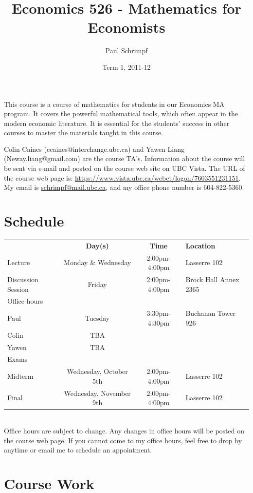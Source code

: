 \documentclass[10pt]{article}
\title{Economics 526 - Mathematics for Economists}
\date{Term 1, 2011-12}
\author{Paul Schrimpf}
\begin{document}
\maketitle

This course is a course of mathematics for students in our Economics
MA program. It covers the powerful mathematical tools, which often
appear in the modern economic literature. It is essential for the
students' success in other courses to master the materials taught in
this course.  

Colin Caines (ccaines@interchange.ubc.ca) and Yawen Liang
(Neway.liang@gmail.com) are the course TA's.  Information about the
course will be sent via e-mail and posted on the course web site on
UBC Vista. The URL of the course web page is:
\url{https://www.vista.ubc.ca/webct/logon/7603551231151}. My email is
\href{mailto:schrimp@mail.ubc.ca}{schrimpf@mail.ubc.ca}, and my office
phone number is 604-822-5360.

\section{Schedule}
\begin{tabular}{l c c l}
  \hline 
  & \textbf{Day(s)} & \textbf{Time} & \textbf{Location} \\
  Lecture & Monday \& Wednesday & 2:00pm-4:00pm &
  Lasserre 102
  \\
  Discussion Session & Friday & 2:00pm-4:00pm &
  Brock Hall Annex 2365
  \\
  Office hours \\
  \; Paul & Tuesday & 3:30pm-4:30pm & Buchanan Tower 926 \\
  \; Colin & TBA & & \\ 
  \; Yawen & TBA & & \\ \hline
  Exams \\
  \; Midterm & Wednesday, October 5th & 2:00pm-4:00pm & Lasserre 102 \\
  \; Final & Wednesday, November 9th & 2:00pm-4:00pm & Lasserre 102
  \\ \hline 
\end{tabular} \\
Office hours are subject to change. Any changes in office hours will
be posted on the course web page. If you cannot come to my office
hours, feel free to drop by anytime or email me to schedule an
appointment.  

\section{Course Work}
\end{document}
